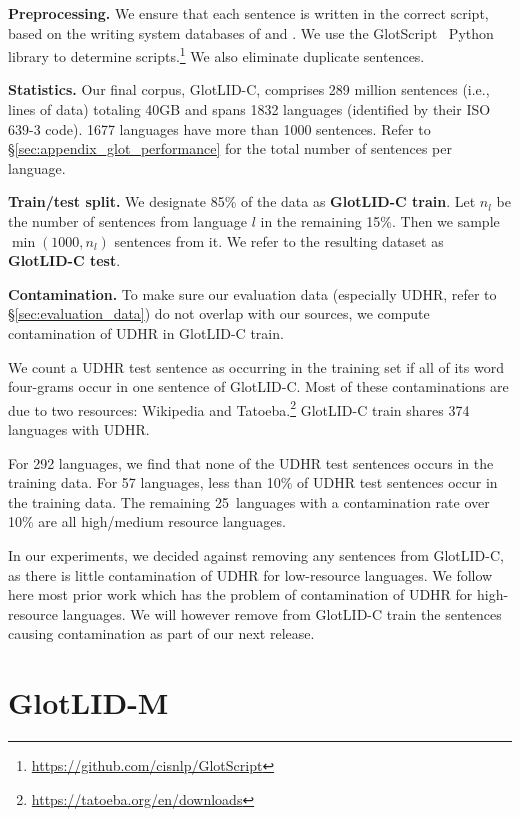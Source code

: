 \documentclass[11pt]{article}
\def\numberlanguagestotal{1832\xspace}
\def\modelname{\mbox{GlotLID-M}\xspace}
\def\corpusname{\mbox{GlotLID-C}\xspace}
\def\udhr{UDHR\xspace}
\def\secref#1{\S\ref{sec:#1}}
\begin{document}
\textbf{Preprocessing.} We ensure that each sentence is written in the correct script, based on the writing system databases of \citet{kargaran2023glotscript} and \citet{van-esch-etal-2022-writing}. We use the GlotScript~\citep{kargaran2023glotscript} Python library to determine scripts.\footnote{\url{https://github.com/cisnlp/GlotScript}} We also eliminate duplicate sentences.

\textbf{Statistics.}
Our final corpus, \corpusname, comprises 289 million
sentences (i.e., lines of data) totaling 40GB and spans
\numberlanguagestotal languages (identified by their ISO
639-3 code). 1677
languages have more than 1000 sentences.
Refer to \secref{appendix_glot_performance} for the total number of sentences per language.

\textbf{Train/test split.}
We designate 85\% of the data
as \textbf{\corpusname train}.
Let $n_l$ be the number of sentences from language $l$ 
in the remaining 15\%. 
Then we sample $\min(1000,n_l)$ sentences from it.
We refer to the resulting dataset
as \textbf{\corpusname test}.

\textbf{Contamination.} To make sure our evaluation data (especially \udhr, refer to \secref{evaluation_data})
do not overlap with our sources, we compute contamination of \udhr in \corpusname train.

We count a \udhr test sentence as occurring in the training set if all of its word four-grams occur in one sentence of \corpusname. 
Most of these contaminations are due to two resources: Wikipedia and
Tatoeba.\footnote{\url{https://tatoeba.org/en/downloads}}
\corpusname train shares 374 languages with \udhr.

For 292 languages, we find that none of the \udhr test sentences occurs in the training data. For 57 languages, less than 10\% of \udhr test sentences occur in the training data. The remaining 25~languages with a contamination rate over 10\% are all high/medium resource languages.

In our experiments, we decided against removing any sentences from \corpusname, as there is little contamination of \udhr for low-resource languages. We follow here most prior work which has the problem of contamination of \udhr for high-resource languages. We will however remove from \corpusname train the sentences causing contamination as part of our next release.


\section{\modelname}
\end{document}
